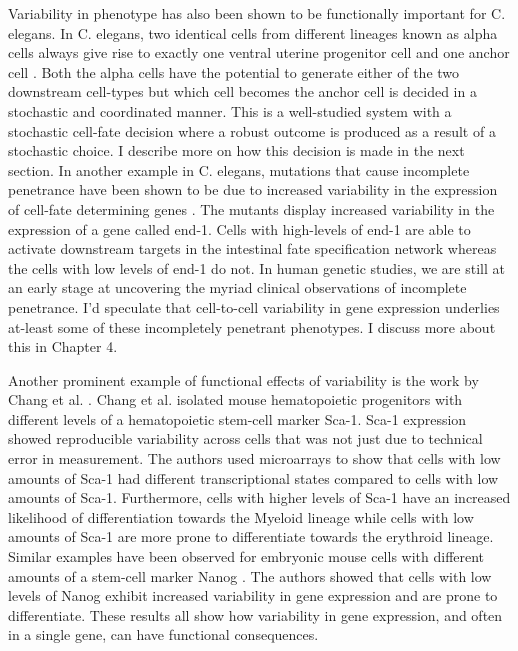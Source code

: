 Variability in phenotype has also been shown to be functionally important for C. elegans. In C. elegans, two identical cells from different lineages known as alpha cells always give rise to exactly one ventral uterine progenitor cell and one anchor cell \cite{seydoux_cell_1989}. Both the alpha cells have the potential to generate either of the two downstream cell-types but which cell becomes the anchor cell is decided in a stochastic and coordinated manner. This is a well-studied system with a stochastic cell-fate decision where a robust outcome is produced as a result of a stochastic choice. I describe more on how this decision is made in the next section. In another example in C. elegans, mutations that cause incomplete penetrance have been shown to be due to increased variability in the expression of cell-fate determining genes  \cite{raj_variability_2010}.  The mutants display increased variability in the expression of a gene called end-1. Cells with high-levels of end-1 are able to activate downstream targets in the intestinal fate specification network whereas the cells with low levels of end-1 do not. In human genetic studies, we are still at an early stage at uncovering the myriad clinical observations of incomplete penetrance. I'd speculate that cell-to-cell variability in gene expression underlies at-least some of these incompletely penetrant phenotypes. I discuss more about this in Chapter 4.

Another prominent example of functional effects of variability is the work by Chang et al. \cite{chang_transcriptome-wide_2008}. Chang et al. isolated mouse hematopoietic progenitors with different levels of a hematopoietic stem-cell marker Sca-1. Sca-1 expression showed reproducible variability across cells that was not just due to technical error in measurement. The authors used microarrays to show that cells with low amounts of Sca-1 had different transcriptional states compared to cells with low amounts of Sca-1. Furthermore, cells with higher levels of Sca-1 have an increased likelihood of differentiation towards the Myeloid lineage while cells with low amounts of Sca-1 are more prone to differentiate towards the erythroid lineage. Similar examples have been observed for embryonic mouse cells with different amounts of a stem-cell marker Nanog \cite{kalmar_regulated_2009}. The authors showed that cells with low levels of Nanog exhibit increased variability in gene expression and are prone to differentiate. These results all show how variability in gene expression, and often in a single gene, can have functional consequences. 

